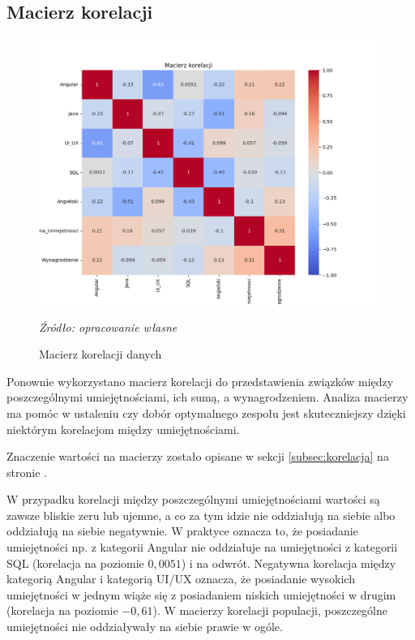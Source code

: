     \subsection{Macierz korelacji}
    \begin{figure}[H]
        \centering
        \includegraphics[width=\linewidth]{chapters/Images/korelacja_optimal.png}
        \cprotect\caption{Macierz korelacji danych}
        \textit{Źródło: opracowanie własne} 
        \label{fig:korelacja_optimal}
    \end{figure}

    \par Ponownie wykorzystano macierz korelacji do przedstawienia związków między poszczególnymi umiejętnościami, ich sumą, a wynagrodzeniem. Analiza macierzy ma pomóc w ustaleniu czy dobór optymalnego zespołu jest skuteczniejszy dzięki niektórym korelacjom między umiejętnościami.

    \par Znaczenie wartości na macierzy zostało opisane w sekcji \ref{subsec:korelacja} na stronie \pageref{subsec:korelacja}.

    \par W przypadku korelacji między poszczególnymi umiejętnościami wartości są zawsze bliskie zeru lub ujemne, a co za tym idzie nie oddziałują na siebie albo oddziałują na siebie negatywnie. W praktyce oznacza to, że posiadanie umiejętności np. z kategorii Angular nie oddziałuje na umiejętności z kategorii SQL (korelacja na poziomie $0,0051$) i na odwrót. Negatywna korelacja między kategorią Angular i kategorią UI/UX oznacza, że posiadanie wysokich umiejętności w jednym wiąże się z posiadaniem niskich umiejętności w drugim (korelacja na poziomie $-0,61$). W macierzy korelacji populacji, poszczególne umiejętności nie oddziaływały na siebie prawie w ogóle.
    
